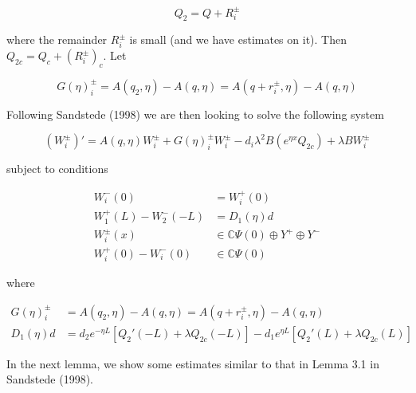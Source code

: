 \documentclass[12pt]{article}
\def\C{{\mathbb C}}
\begin{document}
\[
Q_2 = Q + R_i^\pm
\]

where the remainder $R_i^\pm$ is small (and we have estimates on it). Then $Q_{2c} = Q_c + (R_i^\pm)_c$. Let

\[
G(\eta)_i^\pm = A(q_2,\eta) - A(q,\eta) = A(q + r_i^\pm, \eta) - A(q, \eta)
\]

Following Sandstede (1998) we are then looking to solve the following system

\begin{equation}\label{inteigQ}
(W_i^\pm)' = A(q, \eta)W_i^\pm + G(\eta)_i^\pm W_i^\pm - d_i \lambda^2 B (e^{\eta x}Q_{2c}) + \lambda B W_i^\pm
\end{equation}  

subject to conditions

\begin{align*}
W_i^-(0) &= W_i^+(0) \\
W_1^+(L) - W_2^-(-L) &= D_1(\eta) d \\
W_i^\pm(x) &\in \C \Psi(0) \oplus Y^+ \oplus Y^- \\
W_i^+(0) - W_i^-(0) &\in \C \Psi(0) 
\end{align*}

where 

\begin{align*}
G(\eta)_i^\pm &= A(q_2,\eta) - A(q,\eta) = A(q + r_i^\pm, \eta) - A(q, \eta) \\
D_1(\eta) d &= d_2 e^{-\eta L}[ Q_2'(-L) + \lambda Q_{2c}(-L)] 
- d_1 e^{\eta L}[ Q_2'(L) + \lambda Q_{2c}(L)]
\end{align*}

In the next lemma, we show some estimates similar to that in Lemma 3.1 in Sandstede (1998).
\end{document}
